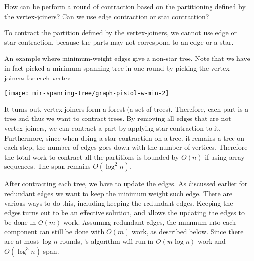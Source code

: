 \begin{question}
  How can be perform a round of contraction based on the partitioning
  defined by the vertex-joiners? Can we use edge contraction or star
  contraction?
\end{question}
%
To contract the partition defined by the vertex-joiners, we cannot use
edge or star contraction, because the parts may not correspond to an
edge or a star.  
%
%
\begin{example}
  An example where minimum-weight edges give a non-star tree.  Note
  that we have in fact picked a minimum spanning tree in one round by
  picking the vertex joiners for each vertex.
\begin{center}
\texttt{[image: min-spanning-tree/graph-pistol-w-min-2]}
\end{center}
\end{example}
%
It turns out, vertex joiners form a forest (a set of trees).
%
Therefore, each part is a tree and thus we want to contract trees. 
%
By removing all edges that are not vertex-joiners, we can contract a
part by applying star contraction to it.  
%
Furthermore, since when doing a star contraction on a tree, it remains
a tree on each step, the number of edges goes down with the number of
vertices. 
%
Therefore the total work to contract all the partitions is bounded by
$O(n)$ if using array sequences.  The span remains $O(\log^2 n)$.

After contracting each tree, we have to update the edges.  As
discussed earlier for redundant edges we want to keep the minimum
weight such edge.  
%
There are various ways to do this, including keeping the redundant
edges.
%
Keeping the edges turns out to be an effective solution, and allows
the updating the edges to be done in $O(m)$ work.  
%
Assuming redundant edges, the minimum into each component can still be
done with $O(m)$ work, as described below.  Since there are at most
$\log n$ rounds, \boruvka's algorithm will run in $O(m \log n)$ work
and $O(\log^3 n)$ span.


